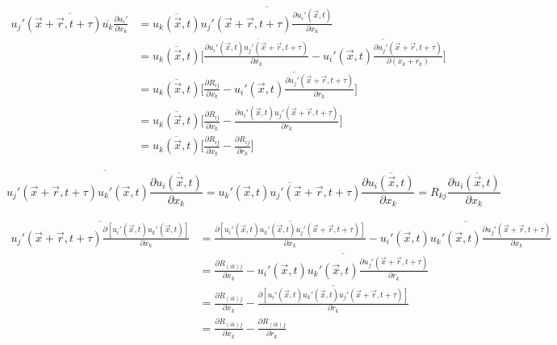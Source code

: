 \documentclass[paper=a4, fontsize=11pt]{scrartcl} %
\numberwithin{equation}{section} %
\numberwithin{figure}{section} %
\numberwithin{table}{section} %
\begin{document}
	\begin{equation}
		\begin{aligned}
			\overline{u_j'(\vec{x} + \vec{r}, t+\tau) \overline{u_k}\frac{\partial u_i'}{\partial x_k}} 
			& = \overline{u_k(\vec{x}, t)} \overline{u_j'(\vec{x} + \vec{r}, t+\tau) \frac{\partial u_i'(\vec{x}, t)}{\partial x_k}}\\
			& = \overline{u_k(\vec{x}, t)} \Bigg[\frac{\partial \overline{u_i'(\vec{x}, t) u_j'(\vec{x} + \vec{r}, t+\tau)}}{\partial x_k}- \overline{u_i'(\vec{x}, t) \frac{\partial u_j'(\vec{x} + \vec{r}, t+\tau)}{\partial (x_k + r_k)}}\Bigg]\\
			& = \overline{u_k(\vec{x}, t)} \Bigg[\frac{\partial R_{ij}}{\partial x_k}- \overline{u_i'(\vec{x}, t) \frac{\partial u_j'(\vec{x} + \vec{r}, t+\tau)}{\partial r_k}}\Bigg]\\
			& = \overline{u_k(\vec{x}, t)} \Bigg[\frac{\partial R_{ij}}{\partial x_k}- \frac{\partial \overline{u_i'(\vec{x}, t) u_j'(\vec{x} + \vec{r}, t+\tau)}}{\partial r_k}\Bigg]\\
			& = \overline{u_k(\vec{x}, t)} \Bigg[\frac{\partial R_{ij}}{\partial x_k}- \frac{\partial R_{ij}}{\partial r_k}\Bigg]
		\end{aligned}
	\end{equation}
	
	\begin{equation}
			\overline{u_j'(\vec{x} + \vec{r}, t+\tau) u_k'(\vec{x}, t) \frac{\partial \overline{u_i(\vec{x}, t)}}{\partial x_k}} = \overline{u_k'(\vec{x}, t) u_j'(\vec{x} + \vec{r}, t+\tau)} \frac{\partial \overline{u_i(\vec{x}, t)}}{\partial x_k} = R_{kj}\frac{\partial \overline{u_i(\vec{x}, t)}}{\partial x_k}
	\end{equation}
	
	\begin{equation}
		\begin{aligned}
			\overline{u_j'(\vec{x} + \vec{r}, t+\tau) \frac{\partial [u_i'(\vec{x}, t)u_k'(\vec{x}, t)]}{\partial x_k}} 
			& = \overline{\frac{\partial [u_i'(\vec{x}, t)u_k'(\vec{x}, t) u_j'(\vec{x} + \vec{r}, t+\tau)]}{\partial x_k}} - \overline{u_i'(\vec{x}, t)u_k'(\vec{x}, t) \frac{\partial u_j'(\vec{x} + \vec{r}, t+\tau)}{\partial x_k}}\\
			& = \frac{\partial R_{(ik)j}}{\partial x_k} - \overline{u_i'(\vec{x}, t)u_k'(\vec{x}, t) \frac{\partial u_j'(\vec{x} + \vec{r}, t+\tau)}{\partial r_k}}\\
			& = \frac{\partial R_{(ik)j}}{\partial x_k} - \overline{\frac{\partial [u_i'(\vec{x}, t)u_k'(\vec{x}, t)u_j'(\vec{x} + \vec{r}, t+\tau)]}{\partial r_k}}\\
			& = \frac{\partial R_{(ik)j}}{\partial x_k} - \frac{\partial R_{(ik)j}}{\partial r_k}
		\end{aligned}
	\end{equation}
	
\end{document}
